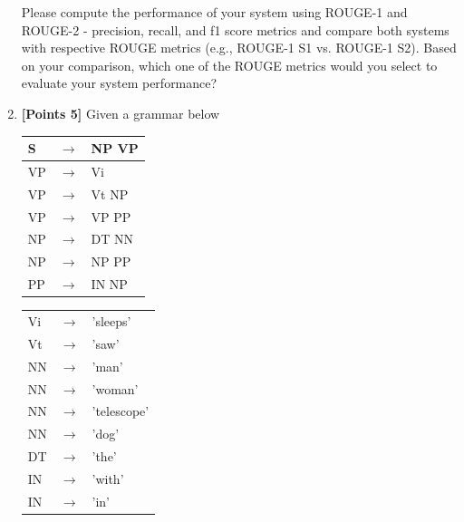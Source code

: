 \documentclass[12pt]{article}
\begin{document}
\begin{enumerate}
            Please compute the performance of your system using ROUGE-1 and ROUGE-2 - precision,
            recall, and f1 score metrics and compare both systems with respective ROUGE metrics (e.g.,
            ROUGE-1 S1 vs. ROUGE-1 S2). Based on your comparison, which one of the ROUGE metrics
            would you select to evaluate your system performance?

      \item \textbf{[Points 5]} Given a grammar below

            \begin{tabular}{|lll|}
                  \hline
                  S  & $\rightarrow$ & NP VP \\
                  \hline
                  VP & $\rightarrow$ & Vi    \\
                  VP & $\rightarrow$ & Vt NP \\
                  VP & $\rightarrow$ & VP PP \\
                  \hline
                  NP & $\rightarrow$ & DT NN \\
                  NP & $\rightarrow$ & NP PP \\
                  \hline
                  PP & $\rightarrow$ & IN NP \\
                  \hline
            \end{tabular}

            \begin{tabular}{|lll|}
                  \hline
                  Vi & $\rightarrow$ & 'sleeps'    \\
                  Vt & $\rightarrow$ & 'saw'       \\
                  \hline
                  NN & $\rightarrow$ & 'man'       \\
                  NN & $\rightarrow$ & 'woman'     \\
                  NN & $\rightarrow$ & 'telescope' \\
                  NN & $\rightarrow$ & 'dog'       \\
                  \hline
                  DT & $\rightarrow$ & 'the'       \\
                  \hline
                  IN & $\rightarrow$ & 'with'      \\
                  IN & $\rightarrow$ & 'in'        \\
                  \hline
            \end{tabular}


\end{enumerate}
\end{document}
